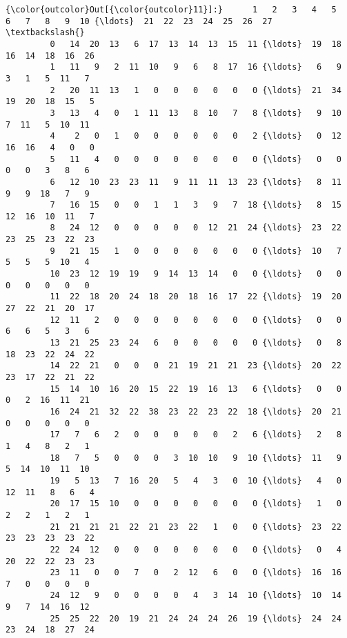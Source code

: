 \documentclass[11pt]{article}
\begin{document}
\begin{Verbatim}[commandchars=\\\{\}]
{\color{outcolor}Out[{\color{outcolor}11}]:}      1   2   3   4   5   6   7   8   9  10 {\ldots}  21  22  23  24  25  26  27  \textbackslash{}
         0   14  20  13   6  17  13  14  13  15  11 {\ldots}  19  18  16  14  18  16  26   
         1   11   9   2  11  10   9   6   8  17  16 {\ldots}   6   9   3   1   5  11   7   
         2   20  11  13   1   0   0   0   0   0   0 {\ldots}  21  34  19  20  18  15   5   
         3   13   4   0   1  11  13   8  10   7   8 {\ldots}   9  10   7  11   5  10  11   
         4    2   0   1   0   0   0   0   0   0   2 {\ldots}   0  12  16  16   4   0   0   
         5   11   4   0   0   0   0   0   0   0   0 {\ldots}   0   0   0   0   3   8   6   
         6   12  10  23  23  11   9  11  11  13  23 {\ldots}   8  11   9   9  18   7   9   
         7   16  15   0   0   1   1   3   9   7  18 {\ldots}   8  15  12  16  10  11   7   
         8   24  12   0   0   0   0   0  12  21  24 {\ldots}  23  22  23  25  23  22  23   
         9   21  15   1   0   0   0   0   0   0   0 {\ldots}  10   7   5   5   5  10   4   
         10  23  12  19  19   9  14  13  14   0   0 {\ldots}   0   0   0   0   0   0   0   
         11  22  18  20  24  18  20  18  16  17  22 {\ldots}  19  20  27  22  21  20  17   
         12  11   2   0   0   0   0   0   0   0   0 {\ldots}   0   0   6   6   5   3   6   
         13  21  25  23  24   6   0   0   0   0   0 {\ldots}   0   8  18  23  22  24  22   
         14  22  21   0   0   0  21  19  21  21  23 {\ldots}  20  22  23  17  22  21  22   
         15  14  10  16  20  15  22  19  16  13   6 {\ldots}   0   0   0   2  16  11  21   
         16  24  21  32  22  38  23  22  23  22  18 {\ldots}  20  21   0   0   0   0   0   
         17   7   6   2   0   0   0   0   0   2   6 {\ldots}   2   8   1   4   8   2   1   
         18   7   5   0   0   0   3  10  10   9  10 {\ldots}  11   9   5  14  10  11  10   
         19   5  13   7  16  20   5   4   3   0  10 {\ldots}   4   0  12  11   8   6   4   
         20  17  15  10   0   0   0   0   0   0   0 {\ldots}   1   0   2   2   1   2   1   
         21  21  21  21  22  21  23  22   1   0   0 {\ldots}  23  22  23  23  23  23  22   
         22  24  12   0   0   0   0   0   0   0   0 {\ldots}   0   4  20  22  22  23  23   
         23  11   0   0   7   0   2  12   6   0   0 {\ldots}  16  16   7   0   0   0   0   
         24  12   9   0   0   0   0   4   3  14  10 {\ldots}  10  14   9   7  14  16  12   
         25  25  22  20  19  21  24  24  24  26  19 {\ldots}  24  24  23  24  18  27  24   

\end{Verbatim}
\end{document}
